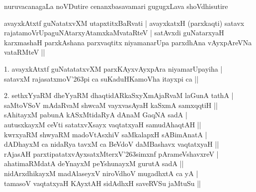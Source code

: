 \begin{entry}
\smallskip
\begin{shl}
nuruvacanagaLa noVDutire cenanxbasavamari gugugxLava shoVdhisutire
\end{shl}
\smallskip
{}
\smallskip
{}
\end{entry}

\begin{entry}
\end{entry}

\begin{entry}
\medskip

\begin{shl}
avayxkAtxtf guNatatxvXM utapxtitxBaRvati | avayxkatxH (parxkaqti) satavx\\
rajatamoVrUpaguNAtarxyAtamxkaMvataRteV | satAvxdi guNatarxyaH\\
karxmashaH parxkAshana parxvaqtitx niyamanarUpa parxdhAna vAyxpAreVNa vataRMteV ||
\end{shl}
\smallskip
\begin{shl}
1. avayxkAtxtf guNatatatxvXM parxKAyxvAyxpAra niyamarUpayiha |\\
satavxM rajasatxmoV\char'263pi ca suKaduHKamoVha itayxpi ca ||
\end{shl}
\medskip
{}
\smallskip
\begin{shl}
2. sethxYyaRM dheYyaRM dhaqtidARkaSxyXmAjaRvaM laGunA tathA |\\
saMtoVSoV mAdaRvaM shwcaM vayxvasAyaH kaSxmA samxqqtiH ||\\
sAhitayxM pabunA kASxMtidaRyA dAnaM GaqNA sadA |\\
autusxkayxM ceVti satatxvXsayx vaqtatxyaH samudAhaqtAH ||\\
kwrxyaRM shwyaRM madoVtAsxhiV saMkalapxH sABimAnatA |\\
dADhayxM ca nidaRya tavxM ca BeVdoV daMBashavx vaqtatxyaH ||\\
rAjasAH parxtipatatxvAyxsatxMterxV\char'263simxnf pArameVshavxreV |\\
ahatimaRMdatA deYnayxM peYshunayxM gurutA sadA ||\\
nidArxdhikayxM madAlaseyxV niroVdhoV mugadhxtA ca yA |\\
tamasoV vaqtatxyaH KAyxtAH sidAdhxH saveRVSu jaMtuSu ||
\end{shl}
\medskip
{}
\end{entry}


